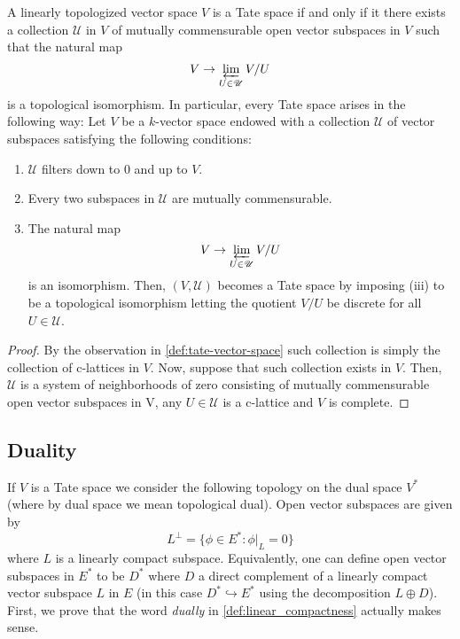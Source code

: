\begin{proposition}\label{prop:characterization-of-tate-spaces-as-inverse-limits}
	A linearly topologized vector space $V$ is a Tate space if and only if it there exists a collection $\mathscr{U}$ in $V$ of mutually commensurable open vector subspaces in $V$ such that the natural map
	\[
		V \to \varprojlim_{U \in \mathscr{U}} V/U
	\]
	is a topological isomorphism. In particular, every Tate space arises in the following way: Let $V$ be a $k$-vector space endowed with a collection $\mathscr{U}$ of vector subspaces satisfying the following conditions:
	\begin{enumerate}[label = (\roman*)]
		\item $\mathscr{U}$ filters down to $0$ and up to $V$.
		\item Every two subspaces in $\mathscr{U}$ are mutually commensurable.
		\item The natural map
		\[
			V \to \varprojlim_{U\in \mathscr{U}} V/U
		\]
		is an isomorphism. Then, $(V, \mathscr{U})$ becomes a Tate space by imposing (iii) to be a topological isomorphism letting the quotient $V/U$ be discrete for all $U \in \mathscr{U}$.
	\end{enumerate}
	
\end{proposition}
\begin{proof}
	By the observation in \cref{def:tate-vector-space} such collection is simply the collection of c-lattices in $V$. Now, suppose that such collection exists in $V$. Then, $\mathscr{U}$ is a system of neighborhoods of zero consisting of mutually commensurable open vector subspaces in V, any $U \in \mathscr{U}$ is a c-lattice and $V$ is complete.
\end{proof}


\subsection{Duality}
If $V$ is a Tate space we consider the following topology on the dual space $V^{*}$ (where by dual space we mean topological dual). Open vector subspaces are given by
\[
	L^{\perp} = \{\phi\in E^{*} \colon \phi\lvert_{L} = 0\}
\]
where $L$ is a linearly compact subspace. Equivalently, one can define open vector subspaces in $E^{*}$ to be $D^{*}$ where $D$ a direct complement of a linearly compact vector subspace $L$ in $E$ (in this case $D^{*} \hookrightarrow E^{*}$ using the decomposition $L\oplus D$).  \\
First, we prove that the word \emph{dually} in \cref{def:linear_compactness} actually makes sense. 

